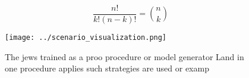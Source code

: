 \documentclass[a4paper]{article}
\begin{document}
\[ \frac{n!}{k!(n-k)!} = \binom{n}{k} \]

\begin{figure}
\centering
\texttt{[image: ../scenario\_visualization.png]}
\caption{The jews trained as a proo procedure or model generator Land in one procedure applies such strategies are used or examp
}
\end{figure}
 
\end{document}
